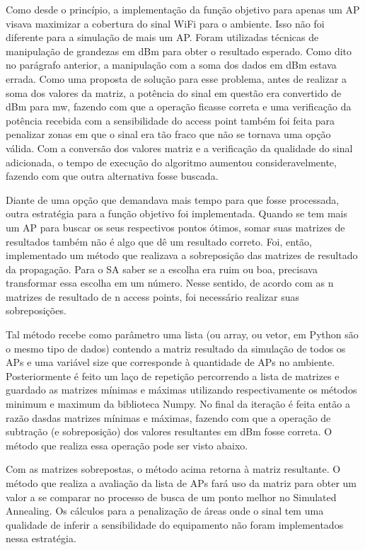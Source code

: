 \documentclass[
	12pt,				%
	openright,			%
	twoside,			%
	a4paper,			%
	english,			%
	french,				%
	spanish,			%
	brazil				%
	]{abntex2}
\begin{document}
Como desde o princípio, a implementação da função objetivo para apenas um AP visava maximizar a cobertura do sinal WiFi para o ambiente. Isso não foi diferente para a simulação de mais um AP. Foram utilizadas técnicas de manipulação de grandezas em dBm para obter o resultado esperado. Como dito no parágrafo anterior, a manipulação com a soma dos dados em dBm estava errada. Como uma proposta de solução para esse problema, antes de realizar a soma dos valores da matriz, a potência do sinal em questão era convertido de dBm para mw, fazendo com que a operação ficasse correta e uma verificação da potência recebida com a sensibilidade do access point também foi feita para penalizar zonas em que o sinal era tão fraco que não se tornava uma opção válida. Com a conversão dos valores matriz e a verificação da qualidade do sinal adicionada, o tempo de execução do algoritmo aumentou consideravelmente, fazendo com que outra alternativa fosse buscada.

Diante de uma opção que demandava mais tempo para que fosse processada, outra estratégia para a função objetivo foi implementada. Quando se tem mais um AP para buscar os seus respectivos pontos ótimos, somar suas matrizes de resultados também não é algo que dê um resultado correto. Foi, então, implementado um método que realizava a sobreposição das matrizes de resultado da propagação. Para o SA saber se a escolha era ruim ou boa, precisava transformar essa escolha em um número. Nesse sentido, de acordo com as n matrizes de resultado de n access points, foi necessário realizar suas sobreposições.

Tal método recebe como parâmetro uma lista (ou array, ou vetor, em Python são o mesmo tipo de dados) contendo a matriz resultado da simulação de todos os APs e uma variável size que corresponde à quantidade de APs no ambiente. Posteriormente é feito um laço de repetição percorrendo a lista de matrizes e guardado as matrizes mínimas e máximas utilizando respectivamente os métodos minimum e maximum da biblioteca Numpy. No final da iteração é feita então a razão dasdas matrizes mínimas e máximas, fazendo com que a operação de subtração (e sobreposição) dos valores resultantes em dBm fosse correta. O método que realiza essa operação pode ser visto abaixo.



Com as matrizes sobrepostas, o método acima retorna à matriz resultante. O método que realiza a avaliação da lista de APs fará uso da matriz para obter um valor a se comparar no processo de busca de um ponto melhor no Simulated Annealing. Os cálculos para a penalização de áreas onde o sinal tem uma qualidade de inferir a sensibilidade do equipamento não foram implementados nessa estratégia. 
\end{document}
